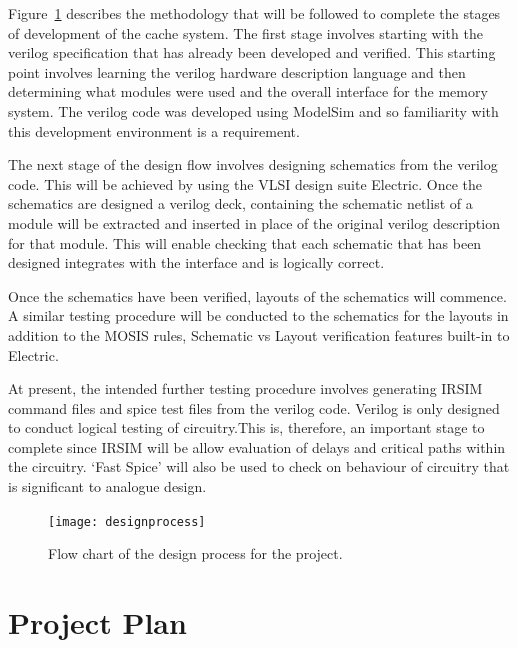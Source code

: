\documentclass[a4paper,12pt]{article}
\begin{document}
Figure~\ref{designprocess} describes the methodology that will be
followed to complete the stages of development of the cache
system. The first stage involves starting with the verilog
specification that has already been developed and verified. This
starting point involves learning the verilog hardware description
language and then determining what modules were used and the overall
interface for the memory system. The verilog code was developed using
ModelSim and so familiarity with this development environment is a
requirement.

The next stage of the design flow involves designing schematics from
the verilog code. This will be achieved by using the VLSI design suite
Electric. Once the schematics are designed a verilog deck, containing
the schematic netlist of a module will be extracted and inserted in
place of the original verilog description for that module. This will
enable checking that each schematic that has been designed integrates
with the interface and is logically correct.

Once the schematics have been verified, layouts of the schematics will
commence. A similar testing procedure will be conducted to the
schematics for the layouts in addition to the MOSIS rules, Schematic
vs Layout verification features built-in to Electric.

At present, the intended further testing procedure involves generating
IRSIM command files and spice test files from the verilog
code. Verilog is only designed to conduct logical testing of
circuitry.This is, therefore, an important stage to complete since
IRSIM will be allow evaluation of delays and critical paths within the
circuitry. `Fast Spice' will also be used to check on behaviour of
circuitry that is significant to analogue design.

\begin{figure}
\centering 
\texttt{[image: designprocess]}
\caption{Flow chart of the design process for the project.}
\label{designprocess}
\end{figure}

\section{Project Plan}
\end{document}
